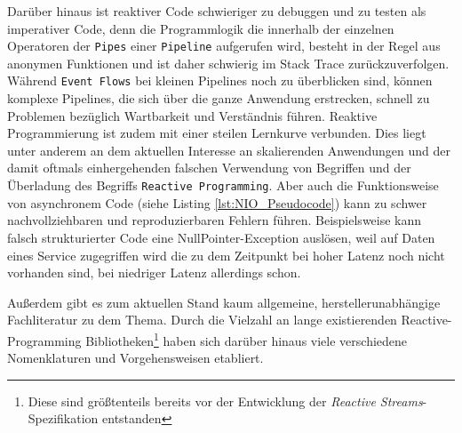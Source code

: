 Darüber hinaus ist reaktiver Code schwieriger zu debuggen und zu testen als imperativer Code, denn die Programmlogik die innerhalb der einzelnen Operatoren
der \verb|Pipes| einer \verb|Pipeline| aufgerufen wird, besteht in der Regel aus anonymen Funktionen und ist daher schwierig im Stack Trace zurückzuverfolgen.
Während \verb|Event Flows| bei kleinen Pipelines noch zu überblicken sind, können komplexe Pipelines, die sich über die ganze Anwendung erstrecken,
schnell zu Problemen bezüglich Wartbarkeit und Verständnis führen.
Reaktive Programmierung ist zudem mit einer steilen Lernkurve verbunden. Dies liegt unter anderem an dem aktuellen Interesse an skalierenden
Anwendungen und der damit oftmals einhergehenden falschen Verwendung von Begriffen und der Überladung des Begriffs \verb|Reactive Programming|.
Aber auch die Funktionsweise von asynchronem Code (siehe Listing \ref{lst:NIO_Pseudocode}) kann zu schwer nachvollziehbaren und
reproduzierbaren Fehlern führen. Beispielsweise kann falsch strukturierter Code eine NullPointer-Exception auslösen, weil
auf Daten eines Service zugegriffen wird die zu dem Zeitpunkt bei hoher Latenz noch nicht vorhanden sind, bei niedriger Latenz
allerdings schon.

Außerdem gibt es zum aktuellen Stand kaum allgemeine, herstellerunabhängige Fachliteratur zu dem Thema.
Durch die Vielzahl an lange existierenden Reactive-Programming Bibliotheken\footnote{Diese sind größtenteils bereits vor der Entwicklung der \textit{Reactive Streams}-Spezifikation entstanden}
haben sich darüber hinaus viele verschiedene Nomenklaturen und Vorgehensweisen etabliert.

